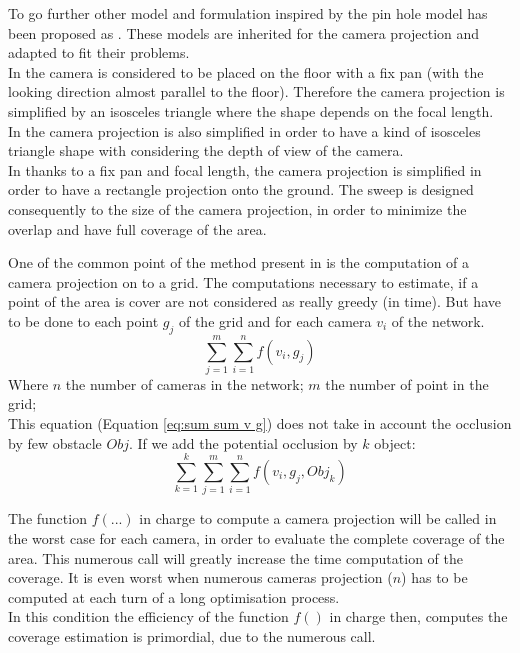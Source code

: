 To go further other model and formulation inspired by the pin hole model has been proposed as \cite{87*morsly2012,141*akbarzadeh2013,146*li2011,194*fu2010}. These models are inherited for the camera projection and adapted to fit their problems. \\
In \cite{87*morsly2012,194*fu2010} the camera is considered to be placed on the floor with a fix pan (with the looking direction almost parallel to the floor). Therefore the camera projection is simplified by an isosceles triangle where the shape depends on the focal length.\\
In \citep{141*akbarzadeh2013} the camera projection is also simplified in order to have a kind of isosceles triangle shape with considering the depth of view of the camera.\\
In \citep{146*li2011} thanks to a fix pan and focal length, the camera projection is simplified in order to have a rectangle projection onto the ground. The sweep is designed consequently to the size of the camera projection, in order to minimize the overlap and have full coverage of the area.  


One of the common point of the method present in \cite{87*morsly2012,141*akbarzadeh2013,146*li2011,194*fu2010,22*zhao2008,33*reddy2012,193*fu2014,181*wang2017,165*jiang2010}   is the computation of a camera projection on to a grid. The computations necessary to estimate, if a point of the area is cover are not considered as really greedy (in time). But have to be done to each point $g_j$ of the grid and for each camera $v_i$ of the network.
	\begin{equation} \label{eq:sum sum v g}
		\sum_{j=1}^{m}\sum_{i=1}^{n}f( v_i,g_j)
	\end{equation}
Where $n$ the number of cameras in the network; $m$ the number of point in the grid; \\
This equation (Equation \ref{eq:sum sum v g}) does not take in account the occlusion by few obstacle $Obj$. If we add the potential occlusion by $k$ object: 
	\begin{equation}
		 \sum_{k=1}^{k}\sum_{j=1}^{m}\sum_{i=1}^{n}f( v_i,g_j,Obj_k)
	\end{equation} 
 
The function $f(...)$ in charge to compute a camera projection will be called in the worst case for each camera, in order to evaluate the complete coverage of the area. This numerous call will greatly increase the time computation of the coverage. It is even worst when numerous cameras projection ($n$) has to be computed at each turn of a long optimisation process.\\
In this condition the efficiency of the function $f()$ in charge then, computes the coverage estimation is primordial, due to the numerous call.



